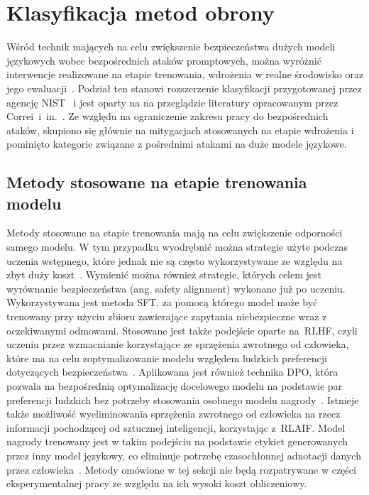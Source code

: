 \section{Klasyfikacja metod obrony}

Wśród technik mających na celu zwiększenie bezpieczeństwa dużych modeli językowych wobec bezpośrednich ataków promptowych, można wyróżnić interwencje realizowane na etapie trenowania, wdrożenia w realne środowisko oraz jego ewaluacji~\cite{correia2026systematicliteraturereviewllm}. Podział ten stanowi rozszerzenie klasyfikacji przygotowanej przez agencję \gls{NIST}~\cite{nist_taxonomy_2025} i jest oparty na na przeglądzie literatury opracowanym przez Correi~i~in.~\cite{correia2026systematicliteraturereviewllm}. Ze względu na ograniczenie zakresu pracy do bezpośrednich ataków, skupiono się głównie na mitygacjach stosowanych na etapie wdrożenia i pominięto kategorie związane z pośrednimi atakami na duże modele językowe.

\subsection{Metody stosowane na etapie trenowania modelu}
Metody stosowane na etapie trenowania mają na celu zwiększenie odporności samego modelu. W tym przypadku wyodrębnić można strategie użyte podczas uczenia wstępnego, które jednak nie są często wykorzystywane ze względu na zbyt duży koszt~\cite{correia2026systematicliteraturereviewllm}. Wymienić można również strategie, których celem jest wyrównanie bezpieczeństwa (ang. safety alignment) wykonane już po uczeniu.
Wykorzystywana jest metoda \gls{SFT}, za pomocą którego model może być trenowany przy użyciu zbioru zawierające zapytania niebezpieczne wraz z oczekiwanymi odmowami. Stosowane jest także podejście oparte na~\gls{RLHF}, czyli uczeniu przez wzmacnianie korzystające ze sprzężenia zwrotnego od człowieka, które ma na celu zoptymalizowanie modelu względem ludzkich preferencji dotyczących bezpieczeństwa~\cite{ouyang2022traininglanguagemodelsfollow}. Aplikowana jest również technika \gls{DPO}, która pozwala na bezpośrednią optymalizację docelowego modelu na podstawie par preferencji ludzkich bez potrzeby stosowania osobnego modelu nagrody~\cite{rafailov2024directpreferenceoptimizationlanguage}. Istnieje także możliwość wyeliminowania sprzężenia zwrotnego od człowieka na rzecz informacji pochodzącej od sztucznej inteligencji, korzystając z~\gls{RLAIF}. Model nagrody trenowany jest w takim podejściu na podstawie etykiet generowanych przez inny model językowy, co eliminuje potrzebę czasochłonnej adnotacji danych przez człowieka~\cite{bai2022constitutionalaiharmlessnessai}.
Metody omówione w tej sekcji nie będą rozpatrywane w części eksperymentalnej pracy ze względu na ich wysoki koszt obliczeniowy.

